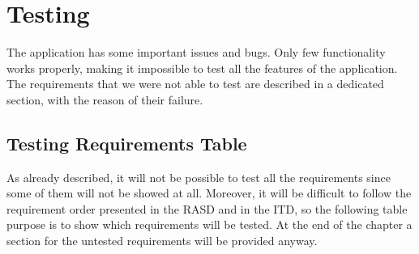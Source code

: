 \documentclass[../ATD.tex]{subfiles}
\begin{document}
    \chapter{Testing}\label{ch:testing}
    The application has some important issues and bugs.
    Only few functionality works properly, making it impossible to test all the features of the application.
    The requirements that we were not able to test are described in a dedicated section, with the reason of their failure.

    \section{Testing Requirements Table}\label{sec:testing-requirements-table}
    As already described, it will not be possible to test all the requirements since some of them will not be showed at all.
    Moreover, it will be difficult to follow the requirement order presented in the RASD and in the ITD, so the following table purpose is to show which requirements will be tested.
    At the end of the chapter a section for the untested requirements will be provided anyway.
\end{document}
